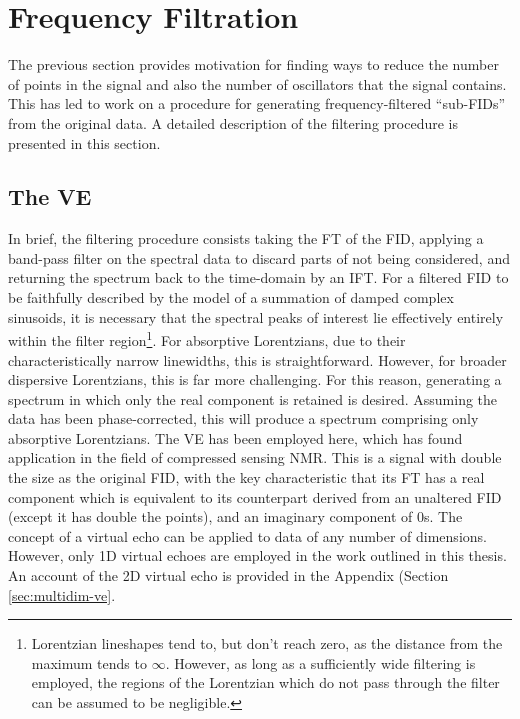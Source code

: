 \section{Frequency Filtration}
\label{sec:filtering}
The previous section provides motivation for finding ways to reduce the
number of points in the signal and also the number of oscillators that the
signal contains. This has led to work on a procedure for generating
frequency-filtered ``sub-FIDs'' from the original data. A detailed description
of the filtering procedure is presented in this section.

\subsection{The \acl{VE}}
\label{subsec:ve}
In brief, the filtering procedure  consists taking the \ac{FT} of the \ac{FID},
applying a band-pass filter on the spectral data to discard parts of not being
considered, and returning the spectrum back to the time-domain by an \ac{IFT}.
For a filtered \ac{FID} to be faithfully described by the model of a
summation of damped complex sinusoids, it is necessary that the
spectral peaks of interest lie effectively entirely within the filter
region\footnote{
    Lorentzian lineshapes tend to, but don't reach zero, as the distance from
    the maximum tends to $\infty$\cite{Tang1994}. However, as long as a
    sufficiently wide filtering is employed, the regions of the Lorentzian
    which do not pass through the filter can be assumed to be negligible.
}.
For absorptive Lorentzians, due to their characteristically narrow
linewidths, this is straightforward. However, for broader dispersive
Lorentzians, this is far more challenging. For this reason, generating
a spectrum in which only the real component is retained is desired.
Assuming the data has been phase-corrected, this will produce a
spectrum comprising only absorptive Lorentzians. The \ac{VE} has been employed
here, which has found application in the field of compressed sensing
NMR\cite{Mayzel2014,Golowicz2020,Luo2020}. This is a signal with double the
size as the original \ac{FID}, with the key characteristic that its \ac{FT} has
a real component which is equivalent to its counterpart derived from an
unaltered \ac{FID} (except it has double the points), and an imaginary
component of $0$s. The concept of a virtual echo can be applied to data of any
number of dimensions. However, only \ac{1D} virtual echoes are employed in the
work outlined in this thesis. An account of the \ac{2D} virtual echo is
provided in the Appendix (Section \ref{sec:multidim-ve}.

